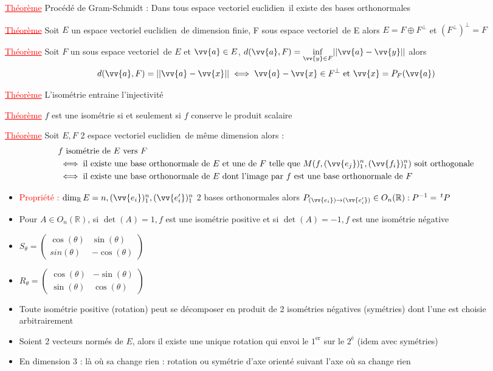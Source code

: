\documentclass[a4paper, french]{article}
\newcommand{\R}{\mathbb{R}}
\newcommand{\ev}{espace vectoriel}
\newcommand{\eve}{espace vectoriel euclidien}
\newcommand{\te}{\theta}
\newcommand{\thm}{\textcolor{red}{\underline{Théorème} }}
\newcommand{\ppt}{\textcolor{red}{Propriété : }}
\begin{document}
	  \thm Procédé de Gram-Schmidt : Dans tous  \eve \, il existe des bases orthonormales 
	 
	  \thm Soit $E$ un \eve \, de dimension finie, F sous \ev\, de E alors $E=F\oplus F^{\perp}$ et $(F^{\perp})^{\perp}=F$ 
	 
	  \thm Soit $F$ un sous \ev \, de $E$ et $\vv{a} \in E$, $d(\vv{a},F)=\underset{\vv{y} \in F}\inf ||\vv{a}-\vv{y}||$ alors $$d(\vv{a},F)=||\vv{a}-\vv{x}|| \iff \vv{a}-\vv{x} \in F^{\perp} \text{ et }\vv{x}=P_F(\vv{a})$$
	  
	  \thm L'isométrie entraine l'injectivité 
	 
	  \thm $f$ est une isométrie si et seulement si $f$ conserve le produit scalaire 
	 
	  \thm Soit $E,F$ 2 \eve \, de même dimension alors :
			 \begin{align*}
				 &f \text{ isométrie de $E$ vers $F$} \\
				 &\iff \text{il existe une base orthonormale de $E$ et une de $F$ telle que $M(f,(\vv{e_j})_1^n,(\vv{f_i})_1^n)$ soit orthogonale} \\
				 &\iff \text{il existe une base orthonormale de $E$ dont l'image par $f$ est une base orthonormale de $F$}
			 \end{align*}

	 \begin{itemize}[label=\(\bullet\)]
		\item \ppt $\dim_{\R}E=n, (\vv{e_i})_1^n,(\vv{e'_i})_1^n$ 2 bases orthonormales alors $P_{(\vv{e_i}) \rightarrow (\vv{e'_i})} \in O_n(\R) : P^{-1}=\,^tP$
		\item Pour $A \in O_n(\R)$, si $\det(A)=1, f$ est une isométrie positive et si $\det(A)=-1,f$ est une isométrie négative
		\item \( S_\te=\begin{pmatrix}
					\cos(\te) & \sin(\te) \\
					sin(\te) & -\cos(\te)
				\end{pmatrix} \)
		\item \( R_\te=\begin{pmatrix}
					\cos(\te) & -\sin(\te) \\
					\sin(\te) & \cos(\te)
				\end{pmatrix} \)
		\item Toute isométrie positive (rotation) peut se décomposer en produit de 2 isométries négatives (symétries) dont l'une est choisie arbitrairement
		\item Soient 2 vecteurs normés de $E$, alors il existe une unique rotation qui envoi le $1^{\text{er}}$ sur le $2^{\text{è}}$ (idem avec symétries)
		\item En dimension 3 : là où sa change rien : rotation ou symétrie d'axe orienté suivant l'axe où sa change rien
	 \end{itemize}
	 
\end{document}
